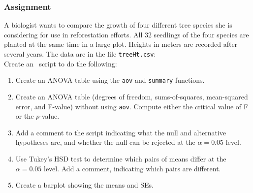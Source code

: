 \documentclass[color=usenames,dvipsnames]{beamer}\usepackage[]{graphicx}\usepackage[]{color}
\newcommand{\inr}[1]{\colorbox{inlinecolor}{\texttt{#1}}}
\begin{document}




\begin{frame}
  \frametitle{Assignment}
  \small
  A biologist wants to compare the growth of four different tree
  species she is considering for use in reforestation efforts.  All 32
  seedlings of the four species are planted at the same time in a
  large plot. Heights in meters are recorded after several years. The data
  are in the file {\tt treeHt.csv}: \\
  \vfill
  Create an \R~script to do the following:
  \begin{enumerate}[\bf (1)]
  \item Create an ANOVA table using the \inr{aov} and \inr{summary}
    functions.
  \item Create an ANOVA table (degrees of freedom,
    sums-of-squares, mean-squared error, and F-value) without using
    \inr{aov}. Compute either the critical value of F or
    the $p$-value.
  \item Add a comment to the script indicating what the null and
    alternative hypotheses are, and whether the null can be rejected
    at the $\alpha = 0.05$ level.
  \item Use Tukey's HSD test to determine which pairs of means differ
    at the $\alpha = 0.05$ level.  Add a comment, indicating which
    pairs are different.
  \item Create a barplot showing the means and SEs.
  \end{enumerate}

\end{frame}
\end{document}
